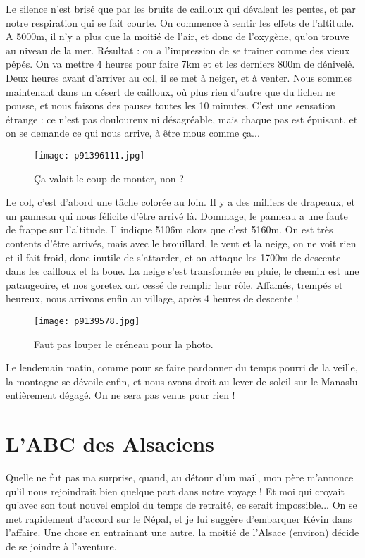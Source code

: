 \documentclass{book}
\begin{document}
Le silence n'est brisé que par les bruits de cailloux qui dévalent les pentes, et par notre respiration qui se fait courte. On commence à sentir les effets de l'altitude. A 5000m, il n'y a plus que la moitié de l'air, et donc de l'oxygène, qu'on trouve au niveau de la mer. Résultat : on a l'impression de se trainer comme des vieux pépés. On va mettre 4 heures pour faire 7km et et les derniers 800m de dénivelé. Deux heures avant d'arriver au col, il se met à neiger, et à venter. Nous sommes maintenant dans un désert de cailloux, où plus rien d'autre que du lichen ne pousse, et nous faisons des pauses toutes les 10 minutes. C'est une sensation étrange : ce n'est pas douloureux ni désagréable, mais chaque pas est épuisant, et on se demande ce qui nous arrive, à être mous comme ça...


\begin{figure}[h]
\centering
\texttt{[image: p91396111.jpg]}
\caption*{Ça valait le coup de monter, non ?}
\end{figure}

Le col, c'est d'abord une tâche colorée au loin. Il y a des milliers de drapeaux, et un panneau qui nous félicite d'être arrivé là. Dommage, le panneau a une faute de frappe sur l'altitude. Il indique 5106m alors que c'est 5160m. On est très contents d'être arrivés, mais avec le brouillard, le vent et la neige, on ne voit rien et il fait froid, donc inutile de s'attarder, et on attaque les 1700m de descente dans les cailloux et la boue. La neige s'est transformée en pluie, le chemin est une pataugeoire, et nos goretex ont cessé de remplir leur rôle. Affamés, trempés et heureux, nous arrivons enfin au village, après 4 heures de descente !


\begin{figure}[h]
\centering
\texttt{[image: p9139578.jpg]}
\caption*{Faut pas louper le créneau pour la photo.}
\end{figure}

Le lendemain matin, comme pour se faire pardonner du temps pourri de la veille, la montagne se dévoile enfin, et nous avons droit au lever de soleil sur le Manaslu entièrement dégagé. On ne sera pas venus pour rien !







\chapter{L'ABC des Alsaciens}
Quelle ne fut pas ma surprise, quand, au détour d'un mail, mon père m'annonce qu'il nous rejoindrait bien quelque part dans notre voyage ! Et moi qui croyait qu'avec son tout nouvel emploi du temps de retraité, ce serait impossible... On se met rapidement d'accord sur le Népal, et je lui suggère d'embarquer Kévin dans l'affaire. Une chose en entrainant une autre, la moitié de l'Alsace (environ) décide de se joindre à l'aventure.
\end{document}
